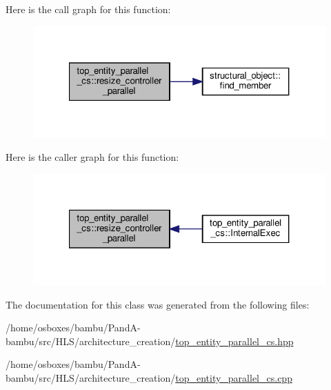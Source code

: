 Here is the call graph for this function\+:
\nopagebreak
\begin{figure}[H]
\begin{center}
\leavevmode
\includegraphics[width=321pt]{d8/d37/classtop__entity__parallel__cs_a4a20b499f50503abb100d7e714db9b9a_cgraph}
\end{center}
\end{figure}
Here is the caller graph for this function\+:
\nopagebreak
\begin{figure}[H]
\begin{center}
\leavevmode
\includegraphics[width=321pt]{d8/d37/classtop__entity__parallel__cs_a4a20b499f50503abb100d7e714db9b9a_icgraph}
\end{center}
\end{figure}


The documentation for this class was generated from the following files\+:\begin{DoxyCompactItemize}
\item 
/home/osboxes/bambu/\+Pand\+A-\/bambu/src/\+H\+L\+S/architecture\+\_\+creation/\hyperlink{top__entity__parallel__cs_8hpp}{top\+\_\+entity\+\_\+parallel\+\_\+cs.\+hpp}\item 
/home/osboxes/bambu/\+Pand\+A-\/bambu/src/\+H\+L\+S/architecture\+\_\+creation/\hyperlink{top__entity__parallel__cs_8cpp}{top\+\_\+entity\+\_\+parallel\+\_\+cs.\+cpp}\end{DoxyCompactItemize}
